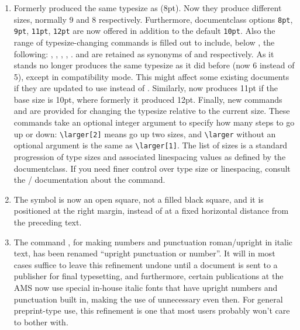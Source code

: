 \documentclass{amsdtx}
\begin{document}
\begin{enumerate}
\item Formerly  produced the same typesize as
 (8pt). Now they produce different sizes, normally 9
and 8 respectively. Furthermore, documentclass options \verb'8pt',
\verb'9pt', \verb'11pt', \verb'12pt' are now offered in addition to the
default \verb'10pt'. Also the range of typesize-changing commands is
filled out to include, below , the following: ,
, , , .  and
 are retained as synonyms of  and 
respectively. As it stands  no longer produces the same
typesize as it did before (now 6 instead of 5), except in compatibility
mode. This might affect some existing documents if they are updated to
use  instead of . Similarly,
 now produces 11pt if the base size is 10pt, where formerly it
produced 12pt. Finally, new commands  and  are
provided for changing the typesize relative to the current size. These
commands take an optional integer argument to specify how many steps to
go up or down: \verb'\larger[2]' means go up two sizes, and
\verb'\larger' without an optional argument is the same as
\verb'\larger[1]'. The list of sizes is a standard progression of type
sizes and associated linespacing values as defined by the documentclass.
If you need finer control over type size or linespacing, consult the
\latex/ documentation about the  command.

\item The  symbol is now an open square, not a filled black
square, and it is positioned at the right margin, instead of at a fixed
horizontal distance from the preceding text.

\item The command , for making numbers and punctuation
roman/upright in italic text, has been renamed  ``upright
punctuation or number''. It will in most cases suffice to leave this
refinement undone until a document is sent to a publisher for final
typesetting, and furthermore, certain publications at the AMS now use
special in-house italic fonts that have upright numbers and punctuation
built in, making the use of  unnecessary even then. For general
preprint-type use, this refinement is one that most users probably won't
care to bother with.

\end{enumerate}
\end{document}
